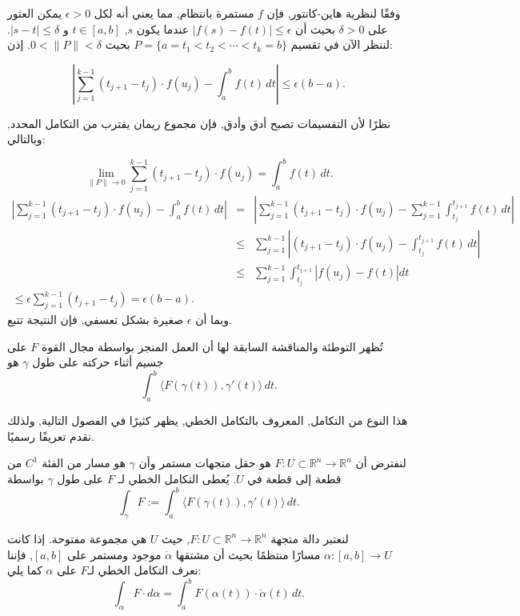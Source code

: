 \begin{demonstration}

وفقًا لنظرية هاين-كانتور, فإن \( f \) مستمرة بانتظام, مما يعني أنه لكل \( \epsilon > 0 \) يمكن العثور على \( \delta > 0 \) بحيث أن \( |f(s) - f(t)| \leq \epsilon \) عندما يكون \( s \), \( t \in [a, b] \) و \( |s - t| \leq \delta \). لننظر الآن في تقسيم \( P = \{a = t_1 < t_2 < \cdots < t_k = b\} \) بحيث \( 0 < \|P\| < \delta \). إذن:

\[ \left| \sum_{j=1}^{k-1} (t_{j+1} - t_j) \cdot f(u_j) - \int_a^b f(t) \, dt \right| \leq \epsilon (b - a). \]

نظرًا لأن التقسيمات تصبح أدق وأدق, فإن مجموع ريمان يقترب من التكامل المحدد, وبالتالي:

\[ \lim_{\|P\| \to 0} \sum_{j=1}^{k-1} (t_{j+1} - t_j) \cdot f(u_j) = \int_a^b f(t) \, dt. \]
\begin{eqnarray*}
\left| \sum_{j=1}^{k-1} (t_{j+1} - t_j) \cdot f(u_j) - \int_a^b f(t) \, dt \right|
&=& \left| \sum_{j=1}^{k-1} (t_{j+1} - t_j) \cdot f(u_j) - \sum_{j=1}^{k-1} \int_{t_j}^{t_{j+1}} f(t) \, dt \right| \\
&\leq& \sum_{j=1}^{k-1} \left| (t_{j+1} - t_j) \cdot f(u_j) - \int_{t_j}^{t_{j+1}} f(t) \, dt \right| \\
 &\leq& \sum_{j=1}^{k-1} \int_{t_j}^{t_{j+1}} \left| f(u_j) - f(t) \right| dt\\
 \leq \epsilon \sum_{j=1}^{k-1} (t_{j+1} - t_j) = \epsilon (b - a).
 \end{eqnarray*}
وبما أن \( \epsilon \) صغيرة بشكل تعسفي, فإن النتيجة تتبع.

\end{demonstration}

تُظهر التوطئة والمناقشة السابقة لها أن العمل المنجز بواسطة مجال القوة \( F \) على جسيم أثناء حركته على طول \( \gamma \) هو
\[ \int_a^b \langle F(\gamma(t)), \gamma'(t) \rangle \, dt. \]

هذا النوع من التكامل, المعروف بالتكامل الخطي, يظهر كثيرًا في الفصول التالية, ولذلك نقدم تعريفًا رسميًا.

\begin{definition}
لنفترض أن \( F : U \subset \mathbb{R}^n \to \mathbb{R}^n \) هو حقل متجهات مستمر وأن \( \gamma \) هو مسار من الفئة \( C^1 \) من قطعة إلى قطعة في \( U \). يُعطى التكامل الخطي لـ \( F \) على طول \( \gamma \) بواسطة
\[ 
\int_\gamma F := \int_a^b \langle F(\gamma(t)), \gamma'(t) \rangle \, dt. 
\]
\end{definition}


لنعتبر دالة متجهة \(F : U \subset \mathbb{R}^n \to \mathbb{R}^n\), حيث \(U\) هي مجموعة مفتوحة. إذا كانت \(\alpha : [a, b] \to U\) مسارًا منتظمًا بحيث أن مشتقها \(\dot{\alpha}\) موجود ومستمر على \([a, b]\), فإننا نعرف التكامل الخطي لـ\(F\) على \(\alpha\) كما يلي:
\[ \int_\alpha F \cdot d\alpha = \int_a^b F(\alpha(t)) \cdot \dot{\alpha}(t) \, dt. \]

